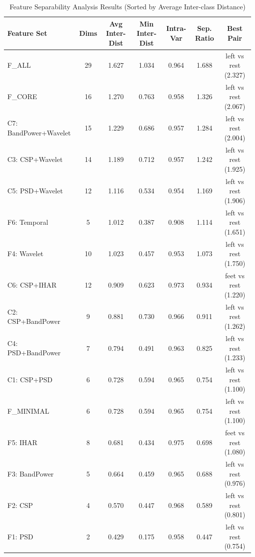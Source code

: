 \documentclass[conference]{IEEEtran}
\begin{document}
\begin{table}[htbp]
\centering
\caption{Feature Separability Analysis Results (Sorted by Average Inter-class Distance)}
\label{tab:tsne_results}
\small
\begin{tabular}{lcccccc}
\toprule
\textbf{Feature Set} & \textbf{Dims} & \textbf{Avg Inter-Dist} & \textbf{Min Inter-Dist} & \textbf{Intra-Var} & \textbf{Sep. Ratio} & \textbf{Best Pair} \\
\midrule
F\_ALL & 29 & 1.627 & 1.034 & 0.964 & 1.688 & left vs rest (2.327) \\
F\_CORE & 16 & 1.270 & 0.763 & 0.958 & 1.326 & left vs rest (2.067) \\
C7: BandPower+Wavelet & 15 & 1.229 & 0.686 & 0.957 & 1.284 & left vs rest (2.004) \\
C3: CSP+Wavelet & 14 & 1.189 & 0.712 & 0.957 & 1.242 & left vs rest (1.925) \\
C5: PSD+Wavelet & 12 & 1.116 & 0.534 & 0.954 & 1.169 & left vs rest (1.906) \\
F6: Temporal & 5 & 1.012 & 0.387 & 0.908 & 1.114 & left vs rest (1.651) \\
F4: Wavelet & 10 & 1.023 & 0.457 & 0.953 & 1.073 & left vs rest (1.750) \\
C6: CSP+IHAR & 12 & 0.909 & 0.623 & 0.973 & 0.934 & feet vs rest (1.220) \\
C2: CSP+BandPower & 9 & 0.881 & 0.730 & 0.966 & 0.911 & left vs rest (1.262) \\
C4: PSD+BandPower & 7 & 0.794 & 0.491 & 0.963 & 0.825 & left vs rest (1.233) \\
C1: CSP+PSD & 6 & 0.728 & 0.594 & 0.965 & 0.754 & left vs rest (1.100) \\
F\_MINIMAL & 6 & 0.728 & 0.594 & 0.965 & 0.754 & left vs rest (1.100) \\
F5: IHAR & 8 & 0.681 & 0.434 & 0.975 & 0.698 & feet vs rest (1.080) \\
F3: BandPower & 5 & 0.664 & 0.459 & 0.965 & 0.688 & left vs rest (0.976) \\
F2: CSP & 4 & 0.570 & 0.447 & 0.968 & 0.589 & left vs rest (0.801) \\
F1: PSD & 2 & 0.429 & 0.175 & 0.958 & 0.447 & left vs rest (0.754) \\
\bottomrule
\end{tabular}
\end{table}
\end{document}
